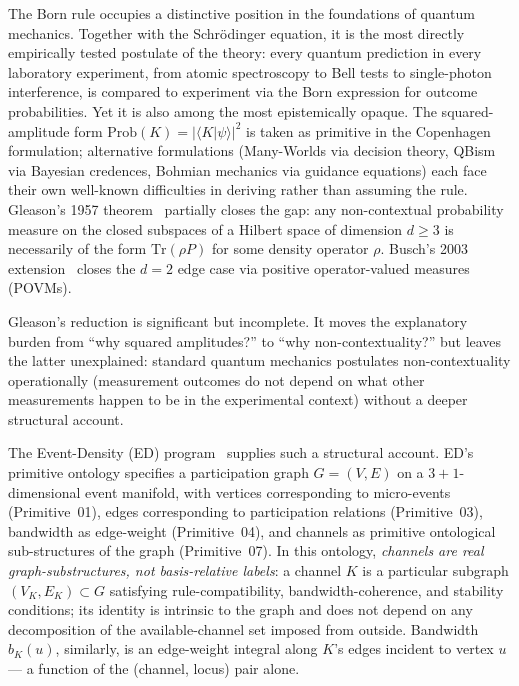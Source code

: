 \documentclass[11pt,a4paper]{article}
\begin{document}
The Born rule occupies a distinctive position in the foundations of quantum mechanics. Together with the Schr\"odinger equation, it is the most directly empirically tested postulate of the theory: every quantum prediction in every laboratory experiment, from atomic spectroscopy to Bell tests to single-photon interference, is compared to experiment via the Born expression for outcome probabilities. Yet it is also among the most epistemically opaque. The squared-amplitude form $\mathrm{Prob}(K) = |\langle K | \psi \rangle|^2$ is taken as primitive in the Copenhagen formulation; alternative formulations (Many-Worlds via decision theory, QBism via Bayesian credences, Bohmian mechanics via guidance equations) each face their own well-known difficulties in deriving rather than assuming the rule. Gleason's 1957 theorem~\cite{gleason} partially closes the gap: any non-contextual probability measure on the closed subspaces of a Hilbert space of dimension $d \geq 3$ is necessarily of the form $\mathrm{Tr}(\rho P)$ for some density operator $\rho$. Busch's 2003 extension~\cite{busch} closes the $d = 2$ edge case via positive operator-valued measures (POVMs).

Gleason's reduction is significant but incomplete. It moves the explanatory burden from ``why squared amplitudes?'' to ``why non-contextuality?'' but leaves the latter unexplained: standard quantum mechanics postulates non-contextuality operationally (measurement outcomes do not depend on what other measurements happen to be in the experimental context) without a deeper structural account.

The Event-Density (ED) program~\cite{phase1,arcr,arcq} supplies such a structural account. ED's primitive ontology specifies a participation graph $G = (V, E)$ on a $3{+}1$-dimensional event manifold, with vertices corresponding to micro-events (Primitive~01), edges corresponding to participation relations (Primitive~03), bandwidth as edge-weight (Primitive~04), and channels as primitive ontological sub-structures of the graph (Primitive~07). In this ontology, \emph{channels are real graph-substructures, not basis-relative labels}: a channel $K$ is a particular subgraph $(V_K, E_K) \subset G$ satisfying rule-compatibility, bandwidth-coherence, and stability conditions; its identity is intrinsic to the graph and does not depend on any decomposition of the available-channel set imposed from outside. Bandwidth $b_K(u)$, similarly, is an edge-weight integral along $K$'s edges incident to vertex $u$ --- a function of the (channel, locus) pair alone.
\end{document}
